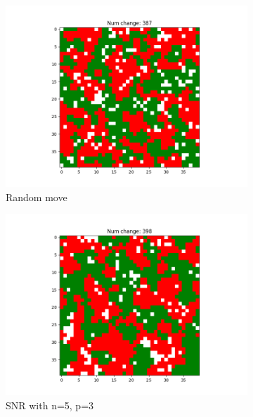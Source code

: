 \documentclass[11pt]{article}
\begin{document}
	\begin{figure}[h]
		\centering
		\begin{subfigure}{0.14\textwidth}
			\includegraphics[width=\linewidth]{final_random.png}
			\caption{\centering Random move}
		\end{subfigure}\hfill
		\begin{subfigure}{0.14\textwidth}
			\includegraphics[width=\linewidth]{final_social_n5p3.png}
			\caption{\centering SNR with n=5, p=3}
			\label{n5p3}
		\end{subfigure}\hfill
		\begin{subfigure}{0.14\textwidth}

\end{subfigure}
\end{figure}
\end{document}
